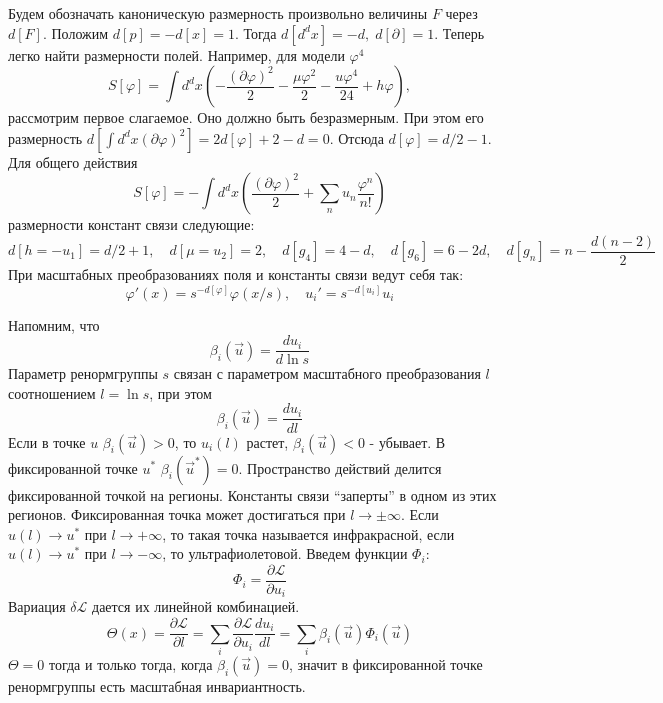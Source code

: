 \documentclass[a4paper,12pt]{article} \usepackage[utf8x]{inputenc} \usepackage[russian]{babel}
\theoremstyle{definition} \newtheorem{corollary}{Corollary}[theorem] \theoremstyle{definition}
\begin{document}
Будем обозначать каноническую размерность произвольно величины $F$ через $d[F]$. Положим
$d[p]=-d[x]=1$. Тогда $d[d^d x]=-d,\; d[\partial]=1$. Теперь легко найти размерности полей.
Например, для модели $\varphi^4$
\begin{equation}
  \label{eq:83} S[\varphi]=\int d^d x\left( -\frac{(\partial \varphi)^2}{2}-\frac{\mu
\varphi^2}{2}-\frac{u\varphi^4}{24}+h\varphi\right),
\end{equation} рассмотрим первое слагаемое. Оно должно быть безразмерным. При этом его размерность
$d[\int d^d x (\partial \varphi)^2]=2d[\varphi]+2-d=0$. Отсюда $d[\varphi]=d/2-1$. Для общего
действия
\begin{equation}
  \label{eq:84} S[\varphi]=-\int d^d x\left( \frac{(\partial \varphi)^2}{2}+\sum_n u_n
\frac{\varphi^n}{n!}\right)
\end{equation} размерности констант связи следующие:
\begin{equation}
  \label{eq:85} d[h=-u_1]=d/2+1,\quad d[\mu=u_2]=2,\quad d[g_4]=4-d,\quad d[g_6]=6-2d,\quad
d[g_n]=n-\frac{d(n-2)}{2}
\end{equation} При масштабных преобразованиях поля и константы связи ведут себя так:
\begin{equation}
  \label{eq:86} \varphi'(x)=s^{-d[\varphi]}\varphi(x/s),\quad u_i'=s^{-d[u_i]}u_i
\end{equation}

Напомним, что
\begin{equation}
  \label{eq:76} \beta_{i}(\vec u)=\frac{du_i}{d\ln s}
\end{equation} Параметр ренормгруппы $s$ связан с параметром масштабного преобразования $l$
соотношением $l=\ln s$, при этом
\begin{equation}
  \label{eq:79} \beta_{i}(\vec u)=\frac{du_i}{dl}
\end{equation} Если в точке $u$ $\beta_i(\vec u)>0$, то $u_i(l)$ растет, $\beta_i (\vec u)<0$ -
убывает. В фиксированной точке $u^*$ $\beta_i(\vec u^*)=0$. Пространство действий делится
фиксированной точкой на регионы. Константы связи ``заперты'' в одном из этих регионов. Фиксированная
точка может достигаться при $l\to \pm \infty$. Если $u(l)\to u^*$ при $l\to +\infty$, то такая точка
называется инфракрасной, если $u(l)\to u^*$ при $l\to -\infty$, то ультрафиолетовой. Введем функции
$\Phi_i$:
\begin{equation}
  \label{eq:77} \Phi_i=\frac{\partial \mathcal{L}}{\partial u_i}
\end{equation} Вариация $\delta \mathcal{L}$ дается их линейной комбинацией.
\begin{equation}
  \label{eq:78} \Theta(x)=\frac{\partial \mathcal{L}}{\partial l}=\sum_i \frac{\partial
\mathcal{L}}{\partial u_i}\frac{d u_i}{dl}=\sum_i\beta_i(\vec u)\Phi_i(\vec u)
\end{equation} $\Theta=0$ тогда и только тогда, когда $\beta_i(\vec u)=0$, значит в фиксированной
точке ренормгруппы есть масштабная инвариантность.
\end{document}
